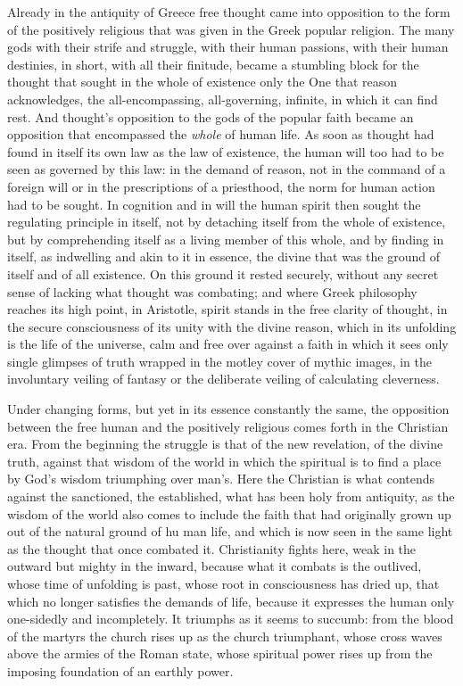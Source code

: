 \documentclass[12pt,a4paper,openany]{book}
\newcommand{\opage}[1]{\marginnote{\footnotesize\textit{[#1]}}}
\begin{document}
Already in the antiquity of Greece free thought came into
opposition to the form of the positively religious that was
given in the Greek popular religion. The many gods with
their strife and struggle, with their human passions,
\opage{290}with their human destinies, in short, with all their
finitude, became a stumbling block for the thought that sought in the whole of
existence only the One that reason acknowledges, the
all-encompassing, all-governing, infinite, in which it can find
rest. And thought's opposition to the gods of the popular faith
became an opposition that encompassed the \emph{whole} of human life.
As soon as thought had found in itself its own law as the
law of existence, the human will too had to be seen
as governed by this law: in the demand of reason, not in
the command of a foreign will or in the prescriptions of a priesthood,
the norm for human action had to be sought. In
cognition and in will the human spirit then sought the regulating
principle in itself, not by detaching itself from the whole
of existence, but by comprehending itself as a living member of
this whole, and by finding in itself, as indwelling and
akin to it in essence, the divine that was the ground of itself and of
all existence. On this ground it rested
securely, without any secret sense of lacking what thought was combating;
and where Greek philosophy reaches its high point,
in Aristotle, spirit stands in the free clarity of thought, in the
secure consciousness of its unity with the divine reason,
which in its unfolding is the life of the universe, calm and
free over against a faith in which it sees only single glimpses of truth
wrapped in the motley cover of mythic images, in the
involuntary veiling of fantasy or the deliberate veiling of calculating
cleverness.

Under changing forms, but yet in its essence constantly
the same, the opposition between the free human
and the positively religious comes forth in the Christian
era. From the beginning the struggle is that of the new revelation,
of the divine truth, against that wisdom of the world
in which the spiritual is to find a place by God's
wisdom triumphing over man's. Here the Christian is what
contends against the sanctioned, the established, what has been holy
from antiquity, as the wisdom of the world also comes
to include the faith that had originally grown up out of the natural ground of hu%
\opage{291}man life, and which is now seen in the same light
as the thought that once combated it. Christianity
fights here, weak in the outward but mighty in the inward, because what
it combats is the outlived, whose time of unfolding is past,
whose root in consciousness has dried up, that which no longer satisfies
the demands of life, because it expresses the human only one-sidedly
and incompletely. It triumphs as it
seems to succumb: from the blood of the martyrs the church rises
up as the church triumphant, whose cross waves above the armies
of the Roman state, whose spiritual power rises up from the imposing
foundation of an earthly power.
\end{document}
